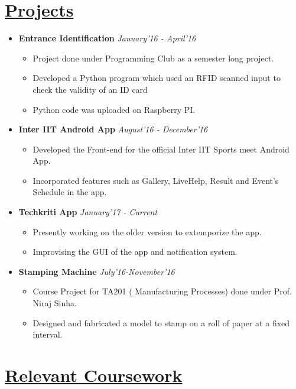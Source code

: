 \documentclass{article}
\begin{document}
\section*{\underline{Projects}}
\begin{itemize}
\item \textbf{Entrance Identification} \hspace{9cm}\textit{January'16 - April'16}
\begin{itemize}
\item Project done under Programming Club as a semester long project. 
\item Developed a Python program which used an RFID scanned input to check the validity of an ID card
\item Python code was uploaded on Raspberry PI. 

\end{itemize}
\item \textbf{Inter IIT Android App} \hspace{9cm}\textit{August'16 - December'16}
\begin{itemize}
\item Developed the Front-end for the official Inter IIT Sports meet Android App.
\item Incorporated features such as Gallery, LiveHelp, Result and Event's Schedule in the app. 
\end{itemize}
\item \textbf{Techkriti App} \hspace{10.5cm}\textit{January'17 - Current}
\begin{itemize}
\item Presently working on the older version to extemporize the app.
\item Improvising the GUI of the app and notification system. 
\end{itemize}
\item \textbf{Stamping Machine} \hspace{9.6cm}\textit{July'16-November'16}
\begin{itemize}
\item Course Project for TA201 ( Manufacturing Processes) done under Prof. Niraj Sinha.
\item Designed and fabricated a model to stamp on a roll of paper at a fixed interval.
\end{itemize}
\end{itemize}

\section*{\underline{Relevant Coursework}}
\end{document}
